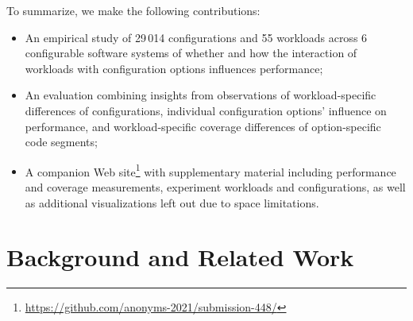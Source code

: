 To summarize, we make the following contributions: 
	
\begin{itemize}
	\item An empirical study of 29\,014 configurations and 55 workloads across 6 configurable software systems of whether and how the interaction of workloads with configuration options influences performance;
	
	\item An evaluation combining insights from observations of workload-specific differences of configurations, individual configuration options' influence on performance, and workload-specific coverage differences of option-specific code segments;

	\item A companion Web site\footnote{\url{https://github.com/anonyms-2021/submission-448/}} with supplementary material including performance and coverage measurements, experiment workloads and configurations, as well as additional visualizations left out due to space limitations.
	
\end{itemize}

\section{Background and Related Work}

